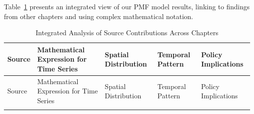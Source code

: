 \documentclass[
  letterpaper,
  oneside,
  openany]{MastersDoctoralThesis}
\begin{document}
Table~\ref{tbl-ch2-integrated} presents an integrated view of our PMF
model results, linking to findings from other chapters and using complex
mathematical notation.

\begin{longtable}[]{@{}
  >{\raggedright\arraybackslash}p{}
  >{\raggedright\arraybackslash}p{}
  >{\raggedright\arraybackslash}p{}
  >{\raggedright\arraybackslash}p{}
  >{\raggedright\arraybackslash}p{}@{}}
\caption{Integrated Analysis of Source Contributions Across
Chapters}\label{tbl-ch2-integrated}\tabularnewline
\toprule\noalign{}
\begin{minipage}[b]{\linewidth}\raggedright
Source
\end{minipage} & \begin{minipage}[b]{\linewidth}\raggedright
Mathematical Expression for Time Series
\end{minipage} & \begin{minipage}[b]{\linewidth}\raggedright
Spatial Distribution
\end{minipage} & \begin{minipage}[b]{\linewidth}\raggedright
Temporal Pattern
\end{minipage} & \begin{minipage}[b]{\linewidth}\raggedright
Policy Implications
\end{minipage} \\
\midrule\noalign{}
\endfirsthead
\toprule\noalign{}
\begin{minipage}[b]{\linewidth}\raggedright
Source
\end{minipage} & \begin{minipage}[b]{\linewidth}\raggedright
Mathematical Expression for Time Series
\end{minipage} & \begin{minipage}[b]{\linewidth}\raggedright
Spatial Distribution
\end{minipage} & \begin{minipage}[b]{\linewidth}\raggedright
Temporal Pattern
\end{minipage} & \begin{minipage}[b]{\linewidth}\raggedright
Policy Implications
\end{minipage} \\
\midrule\noalign{}
\endhead
\bottomrule\noalign{}
\endlastfoot

\end{longtable}
\end{document}
